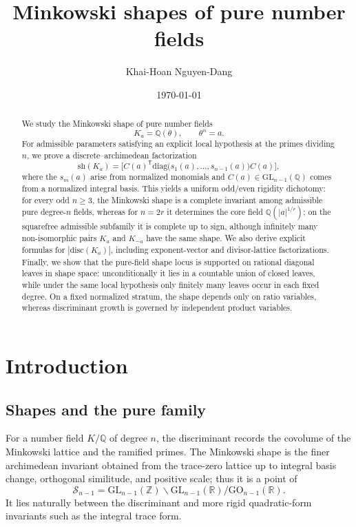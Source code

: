 \documentclass[11pt,letterpaper]{amsart}
\title{Minkowski shapes of pure number fields}
\author{Khai-Hoan Nguyen-Dang}
\date{\today}
\newcommand{\Q}{\mathbb{Q}}
\newcommand{\Z}{\mathbb{Z}}
\newcommand{\R}{\mathbb{R}}
\newcommand{\GL}{\mathrm{GL}}
\newcommand{\GO}{\mathrm{GO}}
\newcommand{\sh}{\mathrm{sh}}
\newcommand{\diag}{\mathrm{diag}}
\newcommand{\disc}{\mathrm{disc}}
\theoremstyle{plain}
\theoremstyle{definition}
\begin{document}
\maketitle
\begin{abstract}
We study the Minkowski shape of pure number fields
\[
K_a=\Q(\theta),\qquad \theta^n=a.
\]
For admissible parameters
satisfying an explicit local hypothesis at the primes dividing \(n\), we prove a
discrete--archimedean factorization
\[
\sh(K_a)=\bigl[C(a)^{\mathsf T}\diag\bigl(s_1(a),\dots,s_{n-1}(a)\bigr)C(a)\bigr],
\]
where the \(s_m(a)\) arise from normalized monomials and
\(C(a)\in\GL_{n-1}(\Q)\) comes from a normalized integral basis. This yields a
uniform odd/even rigidity dichotomy: for every odd \(n\ge 3\), the Minkowski
shape is a complete invariant among admissible pure degree-\(n\) fields, whereas
for \(n=2r\) it determines the core field \(\Q(|a|^{1/r})\); on the squarefree
admissible subfamily it is complete up to sign, although infinitely many
non-isomorphic pairs \(K_a\) and \(K_{-a}\) have the same shape. We also derive
explicit formulas for \(|\disc(K_a)|\), including exponent-vector and
divisor-lattice factorizations. Finally, we show that the pure-field shape locus
is supported on rational diagonal leaves in shape space: unconditionally it lies
in a countable union of closed leaves, while under the same local hypothesis only
finitely many leaves occur in each fixed degree. On a fixed normalized stratum,
the shape depends only on ratio variables, whereas discriminant growth is
governed by independent product variables.
\end{abstract}




\section{Introduction}

\subsection{Shapes and the pure family}

For a number field \(K/\Q\) of degree \(n\), the discriminant records the
covolume of the Minkowski lattice and the ramified primes.  The Minkowski shape
is the finer archimedean invariant obtained from the trace-zero lattice up to integral basis change, orthogonal similitude, and positive scale; thus it
is a point of
\[
\mathscr S_{n-1}
=
\GL_{n-1}(\Z)\backslash \GL_{n-1}(\R)/\GO_{n-1}(\R).
\]
It lies naturally between the discriminant and more rigid quadratic-form
invariants such as the integral trace form.
\end{document}
